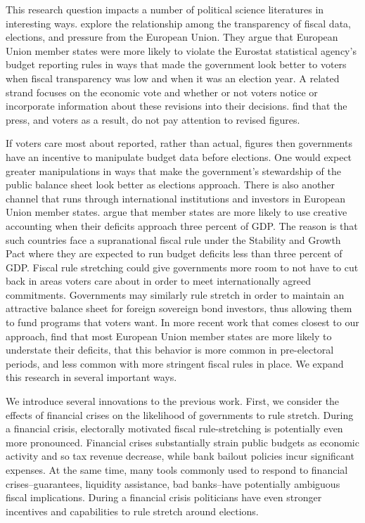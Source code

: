 \documentclass[]{article}
\begin{document}
This research question impacts a number of political science literatures in interesting ways. \cite{Alt2014} explore the relationship among the transparency of fiscal data, elections, and pressure from the European Union. They argue that European Union member states were more likely to violate the Eurostat statistical agency's budget reporting rules in ways that made the government look better to voters when fiscal transparency was low and when it was an election year. A related strand focuses on the economic vote and whether or not voters notice or incorporate information about these revisions into their decisions. \cite{KayserLeininger2015} find that the press, and voters as a result, do not pay attention to revised figures.

If voters care most about reported, rather than actual, figures then governments have an incentive to manipulate budget data before elections. One would expect greater manipulations in ways that make the government's stewardship of the public balance sheet look better as elections approach. There is also another channel that runs through international institutions and investors in European Union member states. \cite{vonHagenWolff2006} argue that member states are more likely to use creative accounting when their deficits approach three percent of GDP. The reason is that such countries face a supranational fiscal rule under the Stability and Growth Pact where they are expected to run budget deficits less than three percent of GDP. Fiscal rule stretching could give governments more room to not have to cut back in areas voters care about in order to meet internationally agreed commitments. Governments may similarly rule stretch in order to maintain an attractive balance sheet for foreign sovereign bond investors, thus allowing them to fund programs that voters want. In more recent work that comes closest to our approach, \cite{DeCastro2013} find that most European Union member states are more likely to understate their deficits, that this behavior is more common in pre-electoral periods, and less common with more stringent fiscal rules in place. We expand this research in several important ways.

We introduce several innovations to the previous work. First, we consider the effects of financial crises on the likelihood of governments to rule stretch. During a financial crisis, electorally motivated fiscal rule-stretching is potentially even more pronounced. Financial crises substantially strain public budgets as economic activity and so tax revenue decrease, while bank bailout policies incur significant expenses. At the same time, many tools commonly used to respond to financial crises--guarantees, liquidity assistance, bad banks--have potentially ambiguous fiscal implications. During a financial crisis politicians have even stronger incentives and capabilities to rule stretch around elections.
\end{document}

